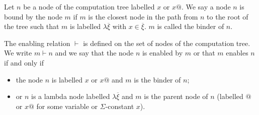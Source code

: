 \begin{dfn}[Binder]
Let $n$ be a node of the computation tree labelled $x$ or $x@$. We
say a node $n$ is bound by the node $m$ if $m$ is the closest node
in the path from $n$ to the root of the tree such that $m$ is
labelled $\lambda \overline{\xi}$ with $x\in \overline{\xi}$. $m$ is
called the binder of $n$.
\end{dfn}

\begin{dfn}[Enabling]
The enabling relation $\vdash$ is defined on the set of nodes of the
computation tree. We write $m \vdash n$ and we say that the node $n$
is enabled by $m$ or that $m$ enables $n$ if and only if
\begin{itemize}
\item the node $n$ is labelled $x$ or $x@$ and $m$ is the binder of $n$;
\item or $n$ is a lambda node labelled $\lambda \overline{\xi}$ and $m$ is the parent node of $n$
        (labelled $@$ or $x@$ for some variable or $\Sigma$-constant $x$).
\end{itemize}
\end{dfn}




